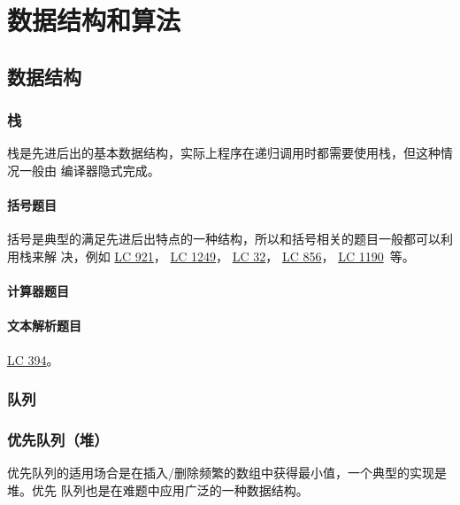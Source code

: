 \part{数据结构和算法}

\chapter{数据结构}

\section{栈}
栈是先进后出的基本数据结构，实际上程序在递归调用时都需要使用栈，但这种情况一般由
编译器隐式完成。

\subsection{括号题目}
括号是典型的满足先进后出特点的一种结构，所以和括号相关的题目一般都可以利用栈来解
决，例如
\href{https://leetcode.com/problems/minimum-add-to-make-parentheses-valid/}{LC
  921}，
\href{https://leetcode.com/problems/minimum-remove-to-make-valid-parentheses/}{LC
  1249}，
\href{https://leetcode.com/problems/longest-valid-parentheses/}{LC
  32}，
\href{https://leetcode.com/problems/score-of-parentheses/}{LC
  856}，
\href{https://leetcode.com/problems/reverse-substrings-between-each-pair-of-parentheses/}{LC 1190}~等。

\subsection{计算器题目}

\subsection{文本解析题目}

\href{https://leetcode.com/problems/decode-string/}{LC 394}。

\section{队列}

\section{优先队列（堆）}
优先队列的适用场合是在插入/删除频繁的数组中获得最小值，一个典型的实现是堆。优先
队列也是在难题中应用广泛的一种数据结构。

